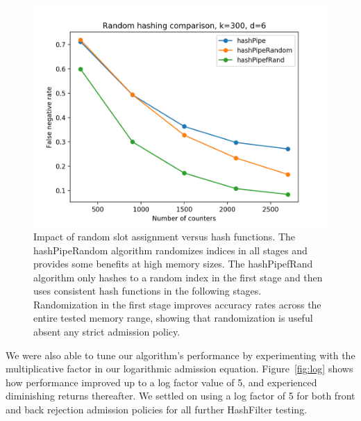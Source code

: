 \begin{figure}[!htb]
  \centering
    \includegraphics[scale=0.5]{random}
     \caption{Impact of random slot assignment versus hash functions. The hashPipeRandom algorithm randomizes indices in all stages and provides some benefits at high memory sizes. The hashPipefRand algorithm only hashes to a random index in the first stage and then uses consistent hash functions in the following stages. Randomization in the first stage improves accuracy rates across the entire tested memory range, showing that randomization is useful absent any strict admission policy.}
     \label{fig:random}
\end{figure}
We were also able to tune our algorithm's performance by experimenting with the multiplicative factor in our logarithmic admission equation. Figure~\ref{fig:log} shows how performance improved up to a log factor value of 5, and experienced diminishing returns thereafter. We settled on using a log factor of 5 for both front and back rejection admission policies for all further HashFilter testing.
